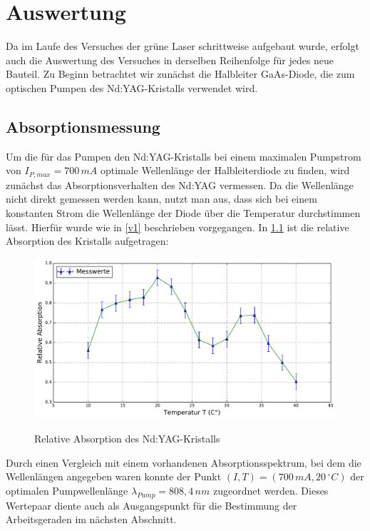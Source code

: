 \documentclass[twoside,colorback,accentcolor=tud4c,11pt]{tudreport}
\begin{document}
     	
\chapter{Auswertung}
Da im Laufe des Versuches der grüne Laser schrittweise aufgebaut wurde, erfolgt auch die  Auswertung des Versuches in derselben Reihenfolge für jedes neue Bauteil. Zu Beginn betrachtet wir zunächst die Halbleiter GaAs-Diode, die zum optischen Pumpen des Nd:YAG-Kristalls verwendet wird.
\section{Absorptionsmessung}
Um die für das Pumpen den Nd:YAG-Kristalls bei einem maximalen Pumpstrom von $I_{P,max}=700\,\si{mA}$ optimale Wellenlänge der Halbleiterdiode zu finden, wird zunächst das Absorptionsverhalten des Nd:YAG vermessen. Da die Wellenlänge nicht direkt gemessen werden kann, nutzt man aus, dass sich bei einem konstanten Strom die Wellenlänge der Diode über die Temperatur durchstimmen lässt. Hierfür wurde wie in \ref{v1} beschrieben vorgegangen. In \ref{abs} ist die relative Absorption des Kristalls aufgetragen:
\begin{figure}[H]
\centering
   	\begin{minipage}[b]{0.9\textwidth}
   	\includegraphics[width=\textwidth]{graphics/relabs_ndyag.pdf}
  	\label{abs}
   	\end{minipage}
\caption{Relative Absorption des Nd:YAG-Kristalls}	
\end{figure}
Durch einen Vergleich mit einem vorhandenen Absorptionsspektrum, bei dem die Wellenlängen angegeben waren konnte der Punkt $(I,T)=(700\,\si{mA},20\,\si{^{\circ}C})$ der optimalen Pumpwellenlänge $\lambda_{Pump}=808,4\,\si{nm}$ zugeordnet werden. Dieses Wertepaar diente auch als Ausgangspunkt für die Bestimmung der Arbeitsgeraden im nächsten Abschnitt.
\end{document}

